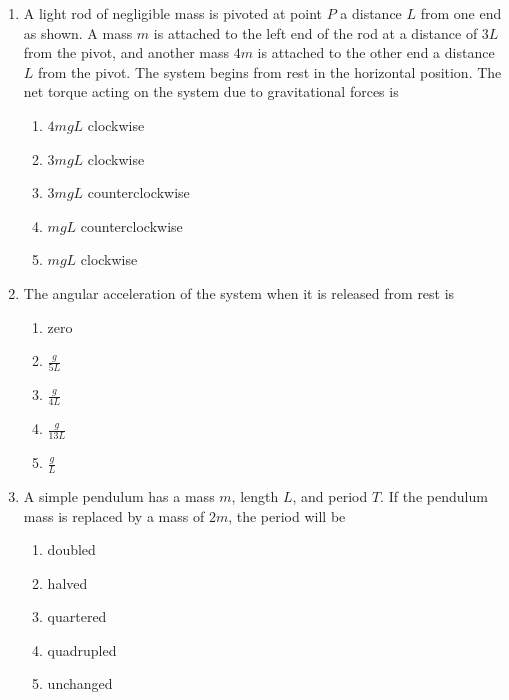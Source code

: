 \documentclass{../../oss-apphys}
\begin{document}
\begin{multicols}{2}
\begin{enumerate}[leftmargin=18pt]
  \item A light rod of negligible mass is pivoted at point $P$ a distance $L$
    from one end as shown. A mass $m$ is attached to the left end of the rod at
    a distance of $3L$ from the pivot, and another mass $4m$ is attached to the
    other end a distance $L$ from the pivot. The system begins from rest in the
    horizontal position. The net torque acting on the system due to
    gravitational forces is
    \begin{center}
    \end{center}
    \begin{enumerate}[noitemsep,topsep=0pt,leftmargin=18pt,label=(\Alph*)]
    \item $4mgL$ clockwise
    \item $3mgL$ clockwise
    \item $3mgL$ counterclockwise
    \item $mgL$ counterclockwise
    \item $mgL$ clockwise
    \end{enumerate}

  \item The angular acceleration of the system when it is released from rest is
    \begin{enumerate}[noitemsep,topsep=0pt,leftmargin=18pt,label=(\Alph*)]
    \item zero
    \item $\displaystyle\frac{g}{5L}$
    \item $\displaystyle\frac{g}{4L}$
    \item $\displaystyle\frac{g}{13L}$
    \item  $\displaystyle\frac{g}{L}$
    \end{enumerate}
    \columnbreak
    
  \item A simple pendulum has a mass $m$, length $L$, and period $T$. If the
    pendulum mass is replaced by a mass of $2m$, the period will be
    \begin{enumerate}[noitemsep,topsep=0pt,leftmargin=18pt,label=(\Alph*)]
    \item doubled
    \item halved
    \item quartered
    \item quadrupled
    \item unchanged
    \end{enumerate}


\end{enumerate}
\end{multicols}
\end{document}
